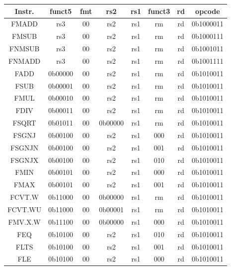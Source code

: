 \documentclass{scrreprt}
\begin{document}
\begin{table}[htb!]
        \centering
        \begin{tabular}{|c|c|c|c|c|c|c|c|} \hline 
             Instr. & funct5 & fmt & rs2 & rs1 & funct3 & rd & opcode\\ \hline 
             FMADD & rs3 & 00 & rs2 & rs1 & rm & rd & 0b1000011\\ \hline 
             FMSUB & rs3 & 00 & rs2 & rs1 & rm & rd & 0b1000111\\ \hline 
             FNMSUB & rs3 & 00 & rs2 & rs1 & rm & rd & 0b1001011\\ \hline 
             FNMADD & rs3 & 00 & rs2 & rs1 & rm & rd & 0b1001111\\ \hline 
             FADD & 0b00000 & 00 & rs2 & rs1 & rm & rd & 0b1010011\\ \hline 
             FSUB & 0b00001 & 00 & rs2 & rs1 & rm & rd & 0b1010011\\ \hline 
             FMUL & 0b00010 & 00 & rs2 & rs1 & rm & rd & 0b1010011\\ \hline 
             FDIV & 0b00011 & 00 & rs2 & rs1 & rm & rd & 0b1010011 \\ \hline 
             FSQRT & 0b01011 & 00 & 0b00000 & rs1 & rm & rd & 0b1010011\\ \hline 
             FSGNJ & 0b00100 & 00 & rs2 & rs1 & 000 & rd & 0b1010011\\ \hline 
             FSGNJN & 0b00100 & 00 & rs2 & rs1 & 001 & rd & 0b1010011\\ \hline 
             FSGNJX & 0b00100 & 00 & rs2 & rs1 & 010 & rd & 0b1010011 \\ \hline 
             FMIN & 0b00101 & 00 & rs2 & rs1 & 000 & rd & 0b1010011\\ \hline 
             FMAX & 0b00101 & 00 & rs2 & rs1 & 001 & rd & 0b1010011\\ \hline 
             FCVT.W & 0b11000 & 00 & 0b00000 & rs1 & rm & rd & 0b1010011\\ \hline 
             FCVT.WU & 0b11000 & 00 & 0b00001 & rs1 & rm & rd & 0b1010011 \\ \hline 
             FMV.X.W & 0b11100 & 00 & 0b00000 & rs1 & 000 & rd & 0b1010011\\ \hline 
             FEQ & 0b10100 & 00 & rs2 & rs1 & 010 & rd & 0b1010011\\ \hline 
             FLTS & 0b10100 & 00 & rs2 & rs1 & 001 & rd & 0b1010011\\ \hline 
             FLE & 0b10100 & 00 & rs2 & rs1 & 000 & rd & 0b1010011 \\ \hline 

\end{tabular}
\end{table}
\end{document}
